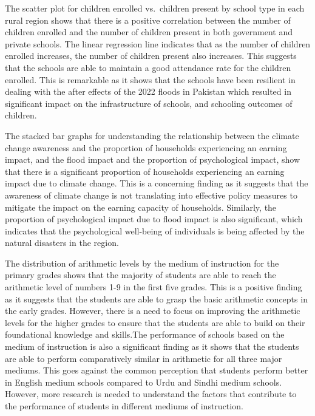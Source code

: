 \documentclass[
]{article}
\begin{document}
The scatter plot for children enrolled vs.~children present by school
type in each rural region shows that there is a positive correlation
between the number of children enrolled and the number of children
present in both government and private schools. The linear regression
line indicates that as the number of children enrolled increases, the
number of children present also increases. This suggests that the
schools are able to maintain a good attendance rate for the children
enrolled. This is remarkable as it shows that the schools have been
resilient in dealing with the after effects of the 2022 floods in
Pakistan which resulted in significant impact on the infrastructure of
schools, and schooling outcomes of children.

The stacked bar graphs for understanding the relationship between the
climate change awareness and the proportion of households experiencing
an earning impact, and the flood impact and the proportion of
psychological impact, show that there is a significant proportion of
households experiencing an earning impact due to climate change. This is
a concerning finding as it suggests that the awareness of climate change
is not translating into effective policy measures to mitigate the impact
on the earning capacity of households. Similarly, the proportion of
psychological impact due to flood impact is also significant, which
indicates that the psychological well-being of individuals is being
affected by the natural disasters in the region.

The distribution of arithmetic levels by the medium of instruction for
the primary grades shows that the majority of students are able to reach
the arithmetic level of numbers 1-9 in the first five grades. This is a
positive finding as it suggests that the students are able to grasp the
basic arithmetic concepts in the early grades. However, there is a need
to focus on improving the arithmetic levels for the higher grades to
ensure that the students are able to build on their foundational
knowledge and skills.The performance of schools based on the medium of
instruction is also a significant finding as it shows that the students
are able to perform comparatively similar in arithmetic for all three
major mediums. This goes against the common perception that students
perform better in English medium schools compared to Urdu and Sindhi
medium schools. However, more research is needed to understand the
factors that contribute to the performance of students in different
mediums of instruction.
\end{document}
